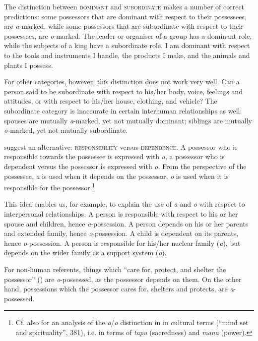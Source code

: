 The distinction between \textsc{dominant} and \textsc{subordinate} makes a number of correct predictions: some possessors that are dominant with respect to their possessees, are \textit{a}{}-marked, while some possessors that are subordinate with respect to their possessees, are \textit{o}{}-marked. The leader or organiser of a group has a dominant role, while the subjects of a king have a subordinate role. I am dominant with respect to the tools and instruments I handle, the products I make, and the animals and plants I possess.

For other categories, however, this distinction does not work very well. Can a person said to be subordinate with respect to his/her body, voice, feelings and attitudes, or with respect to his/her house, clothing, and vehicle? The subordinate category is inaccurate in certain interhuman relationships as well: spouses are mutually \textit{{\ꞌ}a}{}-marked, yet not mutually dominant; siblings are mutually \textit{o-}marked, yet not mutually subordinate. 

\citet{MulloyRapu1977} suggest an alternative: \textsc{responsibility} versus \textsc{dependence}. A possessor who is responsible towards the possessee is expressed with \textit{{\ꞌ}a}, a possessor who is dependent versus the possessor is expressed with \textit{o}. From the perspective of the possessee, \textit{{\ꞌ}a} is used when it depends on the possessor, \textit{o} is used when it is responsible for the possessor.\footnote{\label{fn:305}Cf. also \citet{Thornton1998} for an analysis of the \textit{o}/\textit{a} distinction in  in cultural terms (“mind set and spirituality”, 381), i.e. in terms of \textit{tapu} (sacredness) and \textit{mana} (power).}

This idea enables us, for example, to explain the use of \textit{{\ꞌ}a} and \textit{o} with respect to interpersonal relationships. A person is responsible with respect to his or her spouse and children, hence \textit{a}{}-possession. A person depends on his or her parents and extended family, hence \textit{o}{}-possession. A child is dependent on its parents, hence \textit{o}{}-possession. A person is responsible for his/her nuclear family \mbox{(\textit{{\ꞌ}a}),} but depends on the wider family as a support system (\textit{o}).

For non-human referents, things which “care for, protect, and shelter the possessor” (\citealt[23]{MulloyRapu1977}) are \textit{o}{}-possessed, as the possessor depends on them. On the other hand, possessions which the possessor cares for, shelters and protects, are \textit{a}{}-possessed. 

